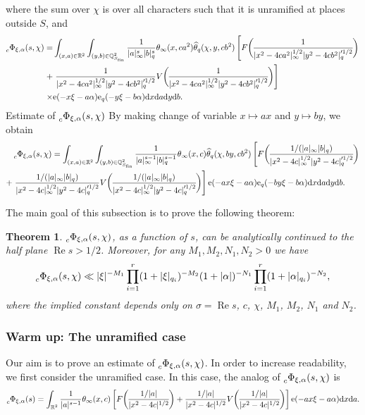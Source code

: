 \documentclass[10pt,oneside,reqno]{amsart}
\makeatletter
\newcommand\rmd{\mathrm{d}}
\newcommand\rme{\mathrm{e}}
\newcommand\QQ{\mathbb{Q}}
\newcommand\RR{\mathbb{R}}
\renewcommand\Re{\mathop{\mathrm{Re}}}
\newcommand\fin{\mathrm{fin}}
\newcommand\legendresymbol[2]{\genfrac{(}{)}{}{}{#1}{#2}}
\def\subsection{\@startsection{subsection}{2}%
  \z@{3pt\@plus0pt}{-.5em}%
  {\normalfont\bfseries}}
\theoremstyle{THEOREM}
\newtheorem{theorem}{Theorem}[section]
\theoremstyle{DEFINITION}
\theoremstyle{EXERCISE}
\numberwithin{equation}{section}
\makeatother
\begin{document}
where the sum over $\chi$ is over all characters such that it is unramified at places outside $S$, and
\begin{equation}\label{eq:defphi}
\begin{split}
\prescript{}{c}\Phi_{\xi,\alpha}(s,\chi)=& \int_{(x,a)\in\RR^2}\int_{(y,b)\in\QQ_{S_\fin}^2} \frac{1}{|a|_\infty^s|b|_q^s} \theta_\infty(x,ca^2)\widehat{\theta}_{q}(\chi,y,cb^2) \left[F\legendresymbol{1}{|x^2-4ca^2|_\infty^{1/2}|y^2- 4cb^2|_q'^{1/2}}\right.\\
+&\left.\frac{1}{|x^2-4ca^2|_\infty^{1/2}|y^2- 4cb^2|_q'^{1/2}}V\legendresymbol{1}{|x^2-4ca^2|_\infty^{1/2}|y^2- 4cb^2|_q'^{1/2}}\right]\\
\times&\rme(-x\xi-a\alpha)\rme_{q}(-y\xi-b\alpha)\rmd x\rmd a\rmd y\rmd b.
\end{split}
\end{equation}
\subsection{Estimate of $\prescript{}{c}\Phi_{\xi,\alpha}(s,\chi)$}
By making change of variable $x\mapsto ax$ and $y\mapsto by$, we obtain
\begin{align*}
&\prescript{}{c}\Phi_{\xi,\alpha}(s,\chi)= \int_{(x,a)\in\RR^2}\int_{(y,b)\in\QQ_{S_\fin}^2} \frac{1}{|a|_\infty^{s-1}|b|_q^{s-1}} \theta_\infty(x,c)\widehat{\theta}_{q}(\chi,by,cb^2) \left[F\legendresymbol{1/(|a|_\infty|b|_q)}{|x^2-4c|_\infty^{1/2}|y^2- 4c|_q'^{1/2}}\right.\\
+&\left.\frac{1/(|a|_\infty|b|_q)}{|x^2-4c|_\infty^{1/2}|y^2- 4c|_q'^{1/2}}V\legendresymbol{1/(|a|_\infty|b|_q)}{|x^2-4c|_\infty^{1/2}|y^2- 4c|_q'^{1/2}}\right]\rme(-ax\xi-a\alpha)\rme_{q}(-by\xi-b\alpha)\rmd x\rmd a\rmd y\rmd b.
\end{align*}

The main goal of this subsection is to prove the following theorem:
\begin{theorem}\label{thm:globalestimatefinal}
$\prescript{}{c}\Phi_{\xi,\alpha}(s,\chi)$, as a function of $s$, can be analytically continued to the half plane $\Re s>1/2$. Moreover, for any $M_1,M_2,N_1,N_2>0$ we have
\[
\prescript{}{c}\Phi_{\xi,\alpha}(s,\chi)\ll|\xi|^{-M_1}\prod_{i=1}^{r}(1+|\xi|_{q_i})^{-M_2}(1+|\alpha|)^{-N_1} \prod_{i=1}^{r}(1+|\alpha|_{q_i})^{-N_2},
\]
where the implied constant depends only on $\sigma=\Re s$, $c$, $\chi$, $M_1$, $M_2$, $N_1$ and $N_2$.
\end{theorem}

\subsubsection{Warm up: The unramified case} 
Our aim is to prove an estimate of $\prescript{}{c}\Phi_{\xi,\alpha}(s,\chi)$. In order to increase readability, we first consider the unramified case. In this case, the analog of $\prescript{}{c}\Phi_{\xi,\alpha}(s,\chi)$ is 
\[
\prescript{}{c}\Phi_{\xi,\alpha}(s)=\int_{\RR^2}\frac{1}{|a|^{s-1}}\theta_\infty(x,c)\left[F\legendresymbol {1/|a|}{|x^2-4c|^{1/2}}+ \frac{1/|a|}{|x^2-4c|^{1/2}} V\legendresymbol{1/|a|}{|x^2-4c|^{1/2}}\right]\rme(-ax\xi-a\alpha)\rmd x\rmd a.
\]
\end{document}
